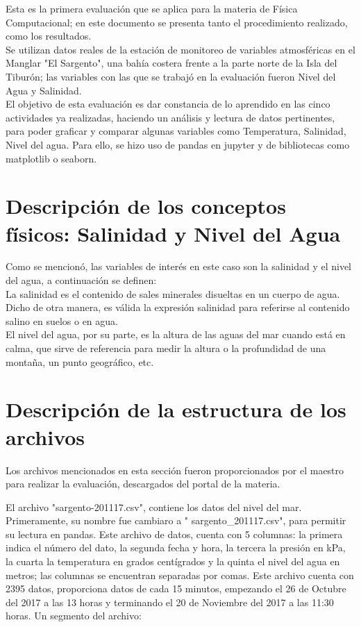\documentclass[12pt]{article}
\begin{document}
Esta es la primera evaluación que se aplica para la materia de Física Computacional; en este documento se presenta tanto el procedimiento realizado, como los resultados.\\

Se utilizan datos reales de la estación de monitoreo de variables atmosféricas en el Manglar "El Sargento", una bahía costera frente a la parte norte de la Isla del Tiburón; las variables con las que se trabajó en la evaluación fueron Nivel del Agua y Salinidad. \\

El objetivo de esta evaluación es dar constancia de lo aprendido en las cinco actividades ya realizadas, haciendo un análisis y lectura de datos pertinentes, para poder graficar y comparar algunas variables como Temperatura, Salinidad, Nivel del agua. Para ello, se hizo uso de pandas en jupyter y de bibliotecas como matplotlib o seaborn. 

\section{Descripción de los conceptos físicos:  Salinidad y Nivel del Agua}

Como se mencionó, las variables de interés en este caso son la salinidad y el nivel del agua, a continuación se definen:\\

La salinidad es el contenido de sales minerales disueltas en un cuerpo de agua. Dicho de otra manera, es válida la expresión salinidad para referirse al contenido salino en suelos o en agua.\\

El nivel del agua, por su parte, es la altura de las aguas del mar cuando está en calma, que sirve de referencia para medir la altura o la profundidad de una montaña, un punto geográfico, etc.

\section{Descripción de la estructura de los archivos}

Los archivos mencionados en esta sección fueron proporcionados por el maestro para realizar la evaluación, descargados del portal de la materia. 

El archivo "sargento-201117.csv", contiene los datos del nivel del mar. Primeramente, su nombre fue cambiaro a " sargento\_201117.csv", para permitir su lectura en pandas. Este archivo de datos, cuenta con 5 columnas: la primera indica el número del dato, la segunda fecha y hora, la tercera la presión en kPa, la cuarta la temperatura en grados centígrados y la quinta el nivel del agua en metros; las columnas se encuentran separadas por comas. Este archivo cuenta con 2395 datos, proporciona datos de cada 15 minutos, empezando el 26 de Octubre del 2017 a las 13 horas y terminando el 20 de Noviembre del 2017 a las 11:30 horas. Un segmento del archivo:
\end{document}
